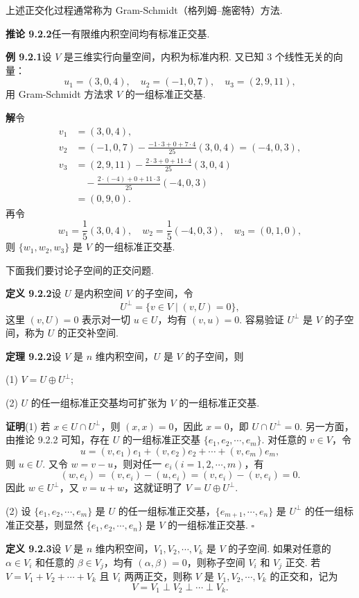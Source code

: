 \documentclass[UTF8, 12pt, fontset=fandol, oneside]{ctexart}
\begin{document}
上述正交化过程通常称为 Gram-Schmidt（格列姆--施密特）方法.

\noindent\textbf{推论 9.2.2}\quad 任一有限维内积空间均有标准正交基.

\noindent\textbf{例 9.2.1}\quad 设 $V$ 是三维实行向量空间，内积为标准内积. 又已知 3 个线性无关的向量：
\[
  u_1=(3,0,4),\quad u_2=(-1,0,7),\quad u_3=(2,9,11),
\]
用 Gram-Schmidt 方法求 $V$ 的一组标准正交基.

\noindent\textbf{解}\quad 令
\[
\begin{aligned}
  v_1&=(3,0,4),\\
  v_2&=(-1,0,7)-\frac{-1\cdot3+0+7\cdot4}{25}(3,0,4)=(-4,0,3),\\
  v_3&=(2,9,11)-\frac{2\cdot3+0+11\cdot4}{25}(3,0,4)\\
  &\quad-\frac{2\cdot(-4)+0+11\cdot3}{25}(-4,0,3)\\
  &=(0,9,0).
\end{aligned}
\]
再令
\[
  w_1=\frac15(3,0,4),\quad w_2=\frac15(-4,0,3),\quad w_3=(0,1,0),
\]
则 $\{w_1,w_2,w_3\}$ 是 $V$ 的一组标准正交基.

下面我们要讨论子空间的正交问题.

\noindent\textbf{定义 9.2.2}\quad 设 $U$ 是内积空间 $V$ 的子空间，令
\[
  U^\perp=\{v\in V\mid (v,U)=0\},
\]
这里 $(v,U)=0$ 表示对一切 $u\in U$，均有 $(v,u)=0$. 容易验证 $U^\perp$ 是 $V$ 的子空间，称为 $U$ 的正交补空间.

\noindent\textbf{定理 9.2.2}\quad 设 $V$ 是 $n$ 维内积空间，$U$ 是 $V$ 的子空间，则

(1) $V=U\oplus U^\perp$;

(2) $U$ 的任一组标准正交基均可扩张为 $V$ 的一组标准正交基.

\noindent\textbf{证明}\quad (1) 若 $x\in U\cap U^\perp$，则 $(x,x)=0$，因此 $x=0$，即 $U\cap U^\perp=0$. 另一方面，由推论 9.2.2 可知，存在 $U$ 的一组标准正交基 $\{e_1,e_2,\cdots,e_m\}$. 对任意的 $v\in V$，令
\[
  u=(v,e_1)e_1+(v,e_2)e_2+\cdots+(v,e_m)e_m,
\]
则 $u\in U$. 又令 $w=v-u$，则对任一 $e_i(i=1,2,\cdots,m)$，有
\[
  (w,e_i)=(v,e_i)-(u,e_i)=(v,e_i)-(v,e_i)=0.
\]
因此 $w\in U^\perp$，又 $v=u+w$，这就证明了 $V=U\oplus U^\perp$.

(2) 设 $\{e_1,e_2,\cdots,e_m\}$ 是 $U$ 的任一组标准正交基，$\{e_{m+1},\cdots,e_n\}$ 是 $U^\perp$ 的任一组标准正交基，则显然 $\{e_1,e_2,\cdots,e_n\}$ 是 $V$ 的一组标准正交基. $\square$

\noindent\textbf{定义 9.2.3}\quad 设 $V$ 是 $n$ 维内积空间，$V_1,V_2,\cdots,V_k$ 是 $V$ 的子空间. 如果对任意的 $\alpha\in V_i$ 和任意的 $\beta\in V_j$，均有 $(\alpha,\beta)=0$，则称子空间 $V_i$ 和 $V_j$ 正交. 若 $V=V_1+V_2+\cdots+V_k$ 且 $V_i$ 两两正交，则称 $V$ 是 $V_1,V_2,\cdots,V_k$ 的正交和，记为
\[
  V=V_1\perp V_2\perp\cdots\perp V_k.
\]
\end{document}
